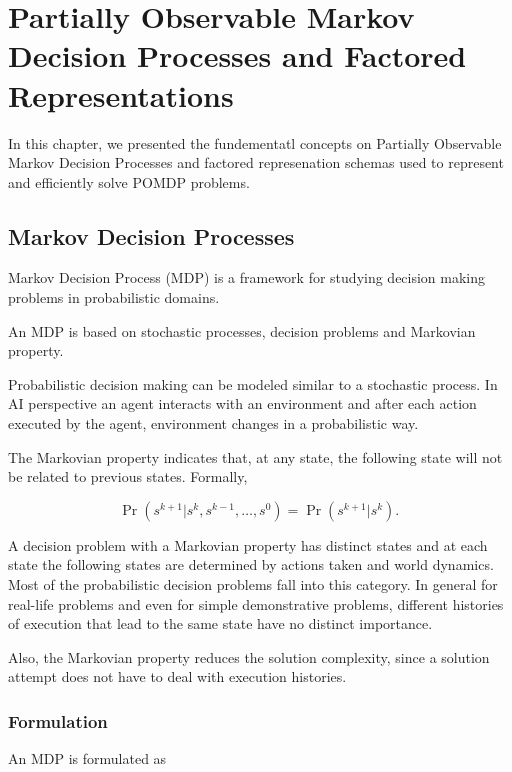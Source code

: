 \chapter{Partially Observable Markov Decision Processes and Factored Representations}
\label{chapter:background}

In this chapter, we presented the fundementatl concepts on Partially Observable Markov Decision Processes and factored represenation schemas used to represent and efficiently solve POMDP problems.

\section{Markov Decision Processes}

Markov Decision Process (MDP) is a framework for studying decision making problems in probabilistic domains.

An MDP is based on stochastic processes, decision problems and Markovian property.

Probabilistic decision making can be modeled similar to a stochastic process. In AI perspective an agent interacts with an environment and after each action executed by the agent, environment changes in a probabilistic way.

The Markovian property indicates that, at any state, the following state will not be related to previous states. Formally,

\begin{displaymath}
\Pr(s^{k+1} | s^{k}, s^{k-1}, \ldots , s^0) = \Pr(s^{k+1} | s^{k}). \,
\end{displaymath}

A decision problem with a Markovian property has distinct states and at each state the following states are determined by actions taken and world dynamics. Most of the probabilistic decision problems fall into this category. In general for real-life problems and even for simple demonstrative problems, different histories of execution that lead to the same state have no distinct importance.

Also, the Markovian property reduces the solution complexity, since a solution attempt does not have to deal with execution histories.

\subsection{Formulation}

An MDP is formulated as

